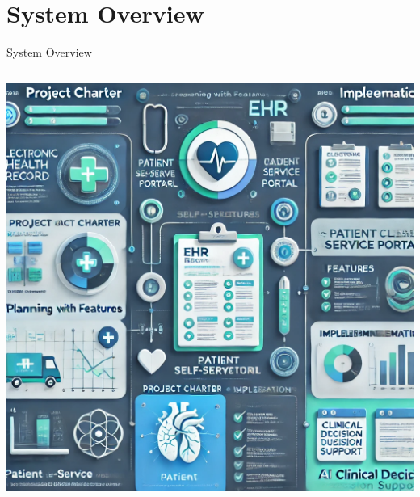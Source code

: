 \documentclass[aspectratio=169]{beamer}
\begin{document}
\section{System Overview}
\begin{frame}{System Overview}
    \begin{columns}[T]
        \begin{center}
            \includegraphics[height=0.8\textheight]{outline_illustration.png}
        \end{center}
    \end{columns}
\end{frame}

\end{document}
